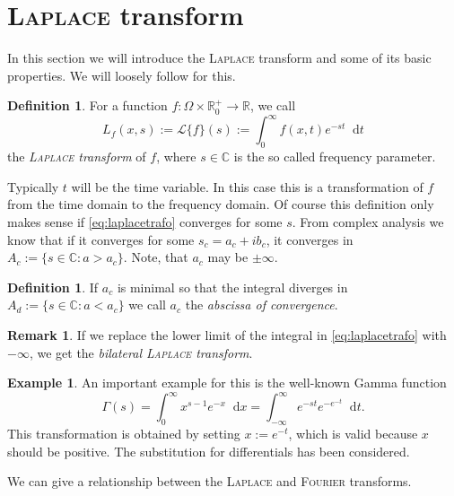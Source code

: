 \documentclass[12pt,a4paper,twoside, open=right]{scrreprt}
\theoremstyle{definition}
\newtheorem{rem}[auf]{Remark}
\newtheorem{defn}[auf]{Definition}
\newtheorem{bsp}[auf]{Example}
\theoremstyle{plain}
\newcommand{\rr}{\mathbb{R}}
\newcommand{\cc}{\mathbb{C}}
\newcommand{\D}{\mathop{}\!\mathrm{d}}
\begin{document}
\section{\textsc{Laplace} transform}
\label{sec:laplacetransform}
In this section we will introduce the \textsc{Laplace} transform and some of its basic properties. We will loosely follow \cite{Widder1945} for this.
\begin{defn}
    For a function $f\colon\Omega\times\rr^+_0\to\rr$, we call
    \begin{equation}
        L_f(x,s):=\mathcal{L}\{f\}(s):=\int_0^\infty f(x,t)e^{-st}\D t\label{eq:laplacetrafo}
    \end{equation}
    the \emph{\textsc{Laplace} transform} of $f$, where $s\in\cc$ is the so called frequency parameter. 
\end{defn}
Typically $t$ will be the time variable. In this case this is a transformation of $f$ from the time domain to the frequency domain. Of course this definition only makes sense if \eqref{eq:laplacetrafo} converges for some $s$. From complex analysis we know that if it converges for some $s_c=a_c+ib_c$, it converges in $A_c:=\{s\in\cc\colon a>a_c\}$. Note, that $a_c$ may be $\pm\infty$.
\begin{defn}
    If $a_c$ is minimal so that the integral diverges in $A_d:=\{s\in\cc\colon a<a_c\}$ we call $a_c$ the \emph{abscissa of convergence}. 
\end{defn}
\begin{rem}
    If we replace the lower limit of the integral in \eqref{eq:laplacetrafo} with $-\infty$, we get the \emph{bilateral \textsc{Laplace} transform}.
\end{rem}
\begin{bsp}
    An important example for this is the well-known Gamma function
    \begin{equation}
        \Gamma(s)=\int_0^\infty x^{s-1}e^{-x}\D x=\int_{-\infty}^\infty e^{-st}e^{-e^{-t}}\D t.
    \end{equation}
    This transformation is obtained by setting $x:=e^{-t}$, which is valid because $x$ should be positive. The substitution for differentials has been considered. 
\end{bsp}
We can give a relationship between the \textsc{Laplace} and \textsc{Fourier} transforms.
\end{document}
